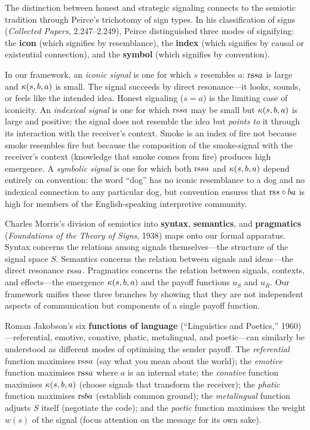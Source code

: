 \begin{interpretation}
\label{interp:ch13:peirce_morris_jakobson}
The distinction between honest and strategic signaling connects to the
semiotic tradition through Peirce's trichotomy of sign types.  In his
classification of signs (\emph{Collected Papers}, 2.247--2.249), Peirce
distinguished three modes of signifying: the \textbf{icon} (which signifies
by resemblance), the \textbf{index} (which signifies by causal or
existential connection), and the \textbf{symbol} (which signifies by
convention).

In our framework, an \emph{iconic signal} is one for which $s$ resembles
$a$: $\mathrm{rs}{s}{a}$ is large and $\kappa(s, b, a)$ is small.  The signal
succeeds by direct resonance---it looks, sounds, or feels like the intended
idea.  Honest signaling ($s = a$) is the limiting case of iconicity.  An
\emph{indexical signal} is one for which $\mathrm{rs}{s}{a}$ may be small but
$\kappa(s, b, a)$ is large and positive: the signal does not resemble the
idea but \emph{points to} it through its interaction with the receiver's
context.  Smoke is an index of fire not because smoke resembles fire but
because the composition of the smoke-signal with the receiver's context
(knowledge that smoke comes from fire) produces high emergence.  A
\emph{symbolic signal} is one for which both $\mathrm{rs}{s}{a}$ and $\kappa(s, b, a)$
depend entirely on convention: the word ``dog'' has no iconic resemblance
to a dog and no indexical connection to any particular dog, but convention
ensures that $\mathrm{rs}{s \circ b}{a}$ is high for members of the English-speaking
interpretive community.

Charles Morris's division of semiotics into \textbf{syntax}, \textbf{semantics},
and \textbf{pragmatics} (\emph{Foundations of the Theory of Signs}, 1938)
maps onto our formal apparatus.  Syntax concerns the relations among signals
themselves---the structure of the signal space $S$.  Semantics concerns the
relation between signals and ideas---the direct resonance $\mathrm{rs}{s}{a}$.
Pragmatics concerns the relation between signals, contexts, and effects---the
emergence $\kappa(s, b, a)$ and the payoff functions $u_S$ and $u_R$.  Our
framework unifies these three branches by showing that they are not
independent aspects of communication but components of a single payoff
function.

Roman Jakobson's six \textbf{functions of language} (``Linguistics and
Poetics,'' 1960)---referential, emotive, conative, phatic, metalingual, and
poetic---can similarly be understood as different modes of optimising the
sender payoff.  The \emph{referential} function maximises $\mathrm{rs}{s}{a}$ (say
what you mean about the world); the \emph{emotive} function maximises
$\mathrm{rs}{s}{a}$ where $a$ is an internal state; the \emph{conative} function
maximises $\kappa(s, b, a)$ (choose signals that transform the receiver);
the \emph{phatic} function maximises $\mathrm{rs}{b}{a}$ (establish common ground);
the \emph{metalingual} function adjusts $S$ itself (negotiate the code); and
the \emph{poetic} function maximises the weight $w(s)$ of the signal
(focus attention on the message for its own sake).
\end{interpretation}



